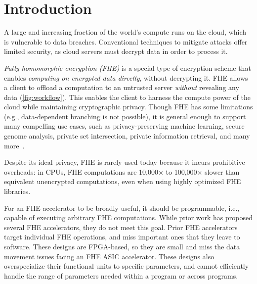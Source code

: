 \chapter{Introduction}\label{sec:intro}

A large and increasing fraction of the world's compute runs on the cloud, which
is vulnerable to data breaches. Conventional techniques to mitigate attacks
offer limited security, as cloud servers must decrypt data in order to process
it.

\figWorkflow

\emph{Fully homomorphic encryption (FHE)} is a special type of encryption
scheme that enables \emph{computing on encrypted data directly}, without
decrypting it. FHE allows a client to offload a computation to an untrusted
server \emph{without} revealing any data (\autoref{fig:workflow}). This enables
the client to harness the compute power of the cloud while maintaining
cryptographic privacy. Though FHE has some limitations (e.g., data-dependent
branching is not possible), it is general enough to support many compelling use
cases, such as privacy-preserving machine learning, secure genome analysis,
private set intersection, private information retrieval, and many
more~\cite{kim2020semi,gilad:icml16:cryptonets,han:aaai19:logistic,han:iacr18:efficient,juvekar2018gazelle,DBLP:conf/ccs/ChenLR17,DBLP:conf/tcc/GentryH19}.

Despite its ideal privacy, FHE is rarely used today because it incurs
prohibitive overheads: in CPUs, FHE computations are 10,000$\times$ to
100,000$\times$ slower than equivalent unencrypted computations, even when
using highly optimized FHE libraries.

For an FHE accelerator to be broadly useful, it should be programmable, i.e.,
capable of executing arbitrary FHE computations. While prior work has proposed
several FHE accelerators, they do not meet this goal. Prior FHE
accelerators~\cite{cousins:hpec14:fpga-he,cousins:tetc17:fpga-he,doroz:tc15:accelerating-fhe,roy:hpca19:fpga-he,riazi:asplos20:heax,turan:tc20:heaws}
target individual FHE operations, and miss important ones that they leave to
software. These designs are FPGA-based, so they are small and miss the data
movement issues facing an FHE ASIC accelerator. These designs also
overspecialize their functional units to specific parameters, and cannot
efficiently handle the range of parameters needed within a program or across
programs.

